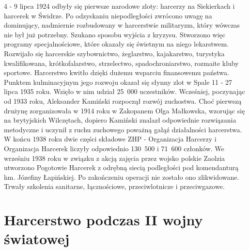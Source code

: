 4 - 9 lipca 1924 odbyły się pierwsze narodowe zloty: harcerzy na Siekierkach i harcerek w Świdrze. Po odzyskaniu niepodległości zwrócono uwagę na dominujący, nadmiernie rozbudowany w harcerstwie militaryzm, który wówczas nie był już potrzebny. Szukano sposobu wyjścia z kryzysu. Stworzono więc programy specjalnościowe, które okazały się świetnym na niego lekarstwem. Rozwijało się harcerskie szybownictwo, żeglarstwo, kajakarstwo, turystyka kwalifikowana, krótkofalarstwo, strzelectwo, spadochroniarstwo, rozmaite kluby sportowe. Harcerstwo kwitło dzięki dużemu wsparciu finansowemu państwa. Punktem kulminacyjnym jego rozwoju okazał się słynny zlot w Spale 11 - 27 lipca 1935 roku. Wzięło w nim udział 25~000 uczestników. Wcześniej, poczynając od 1933 roku, Aleksander Kamiński rozpoczął rozwój zuchostwa. Choć pierwszą drużynę zorganizowała w 1914 roku w Zakopanem Olga Małkowska, wzorując się na brytyjskich Wilczętach, dopiero Kamiński znalazł odpowiednie rozwiązania metodyczne i uczynił z ruchu zuchowego poważną gałąź działalności harcerstwa. W końcu 1938 roku dwie części składowe ZHP - Organizacja Harcerzy i Organizacja Harcerek liczyły odpowiednio 130~500 i 71~600 członków. We wrześniu 1938 roku w związku z akcją zajęcia przez wojsko polskie Zaolzia utworzono Pogotowie Harcerek z odrębną siecią podległości pod komendanturą hm. Józefiny Łapińskiej. Po zakończeniu operacji nie zostało ono zlikwidowane. Trwały szkolenia sanitarne, łącznościowe, przeciwlotnicze i przeciwgazowe.

\section{Harcerstwo podczas II wojny światowej}

